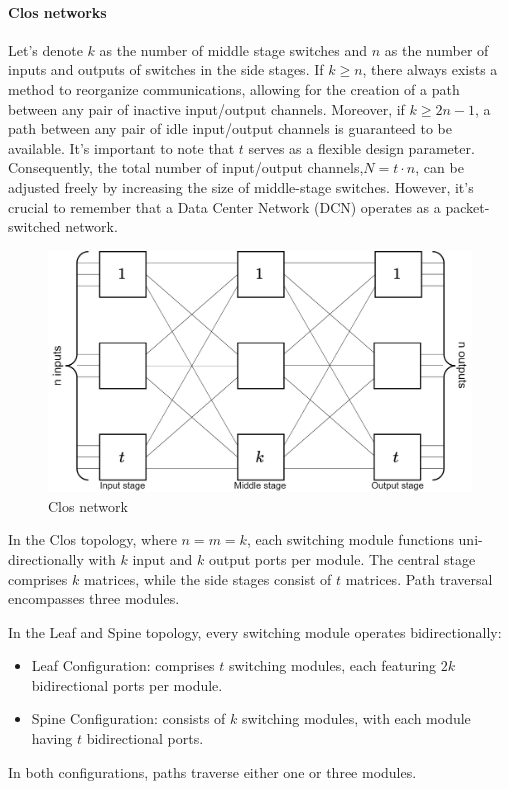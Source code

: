 \paragraph*{Clos networks}
Let's denote $k$ as the number of middle stage switches and $n$ as the number of inputs and outputs of switches in the side stages.
If $k\geq n$, there always exists a method to reorganize communications, allowing for the creation of a path between any pair of inactive input/output channels.
Moreover, if $k\geq 2n-1$, a path between any pair of idle input/output channels is guaranteed to be available.
It's important to note that $t$ serves as a flexible design parameter. 
Consequently, the total number of input/output channels,$ N=t\cdot n$, can be adjusted freely by increasing the size of middle-stage switches.
However, it's crucial to remember that a Data Center Network (DCN) operates as a packet-switched network.
\begin{figure}[H]
    \centering
    \includegraphics[width=0.6\linewidth]{images/stage.png}
    \caption{Clos network}
\end{figure}
In the Clos topology, where $n=m=k$, each switching module functions uni-directionally with $k$ input and $k$ output ports per module. 
The central stage comprises $k$ matrices, while the side stages consist of $t$ matrices. 
Path traversal encompasses three modules.

In the Leaf and Spine topology, every switching module operates bidirectionally: 
\begin{itemize}
    \item Leaf Configuration: comprises $t$ switching modules, each featuring $2k$ bidirectional ports per module.
    \item Spine Configuration: consists of $k$ switching modules, with each module having $t$ bidirectional ports.
\end{itemize}
In both configurations, paths traverse either one or three modules.

